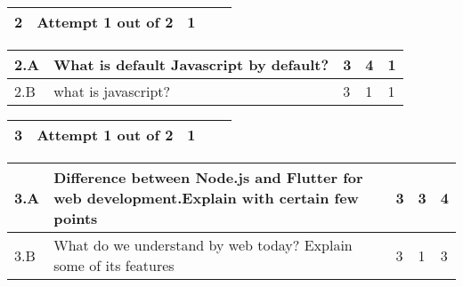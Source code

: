 \documentclass[12pt]{article}
\begin{document}
	
	


	
	
		\begin{tabular}{L{1cm}L{9cm}C{2cm}C{2cm}C{1cm}}
		\bf2 & Attempt 1 out of 2 & 1 & & \\ \hline
	\end{tabular}

	
	
	\begin{tabular}{|L{1cm}|L{9cm}|C{2cm}|C{2cm}|C{1cm}|}
				2.A &
	What is default Javascript by default? &  3 & 4 & 1\\ \hline
		2.B &
	what is javascript? &  3 & 1 & 1\\ \hline
		\end{tabular}

	
	


	
	
		\begin{tabular}{L{1cm}L{9cm}C{2cm}C{2cm}C{1cm}}
		\bf3 & Attempt 1 out of 2 & 1 & & \\ \hline
	\end{tabular}

	
	
	\begin{tabular}{|L{1cm}|L{9cm}|C{2cm}|C{2cm}|C{1cm}|}
				3.A &
	Difference between Node.js and Flutter for web development.Explain with certain few points &  3 & 3 & 4\\ \hline
		3.B &
	What do we understand by web today? Explain some of its features &  3 & 1 & 3\\ \hline
		\end{tabular}

	
	


	
	
		
	
\end{document}
